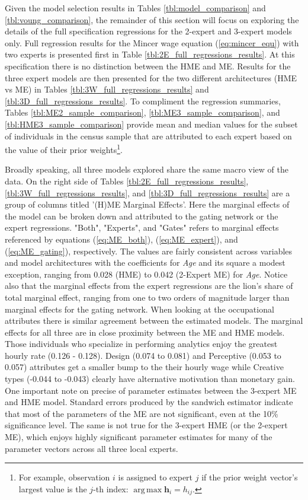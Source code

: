 \documentclass[12pt]{article}
\DeclareMathOperator*{\argmax}{arg\,max}
\theoremstyle{definition}
\begin{document}
Given the model selection results in Tables \ref{tbl:model_comparison} and \ref{tbl:voung_comparison}, the remainder of this section will focus on exploring the details of the full specification regressions for the 2-expert and 3-expert models only. Full regression results for the Mincer wage equation (\ref{eq:mincer_equ}) with two experts is presented first in Table \ref{tbl:2E_full_regressions_results}. At this specification there is no distinction between the HME and ME. Results for the three expert models are then presented for the two different architectures (HME vs ME) in Tables \ref{tbl:3W_full_regressions_results} and \ref{tbl:3D_full_regressions_results}. To compliment the regression summaries, Tables \ref{tbl:ME2_sample_comparison}, \ref{tbl:ME3_sample_comparison}, and \ref{tbl:HME3_sample_comparison} provide mean and median values for the subset of individuals in the census sample that are attributed to each expert based on the value of their prior weights\footnote{For example, observation $i$ is assigned to expert $j$ if the prior weight vector's largest value is the $j$-th index: $\argmax \boldsymbol{h}_{i} = h_{ij}$.}.

\bigskip

Broadly speaking, all three models explored share the same macro view of the data. On the right side of Tables \ref{tbl:2E_full_regressions_results}, \ref{tbl:3W_full_regressions_results}, and \ref{tbl:3D_full_regressions_results} are a group of columns titled '(H)ME Marginal Effects'. Here the marginal effects of the model can be broken down and attributed to the gating network or the expert regressions. "Both", "Experts", and "Gates" refers to marginal effects referenced by equations (\ref{eq:ME_both}), (\ref{eq:ME_expert}), and (\ref{eq:ME_gating}), respectively. The values are fairly consistent across variables and model architectures with the coefficients for \textit{Age} and its square a modest exception, ranging from 0.028 (HME) to 0.042 (2-Expert ME) for \textit{Age}. Notice also that the marginal effects from the expert regressions are the lion's share of total marginal effect, ranging from one to two orders of magnitude larger than marginal effects for the gating network. When looking at the occupational attributes there is similar agreement between the estimated models. The marginal effects for all three are in close proximity between the ME and HME models. Those individuals who specialize in performing analytics enjoy the greatest hourly rate (0.126 - 0.128). Design (0.074 to 0.081) and Perceptive (0.053 to 0.057) attributes get a smaller bump to the their hourly wage while Creative types (-0.044 to -0.043) clearly have alternative motivation than monetary gain. One important note on precise of parameter estimates between the 3-expert ME and HME model. Standard errors produced by the sandwich estimator indicate that most of the parameters of the ME are not significant, even at the 10\% significance level. The same is not true for the 3-expert HME (or the 2-expert ME), which enjoys highly significant parameter estimates for many of the parameter vectors across all three local experts.
\end{document}
